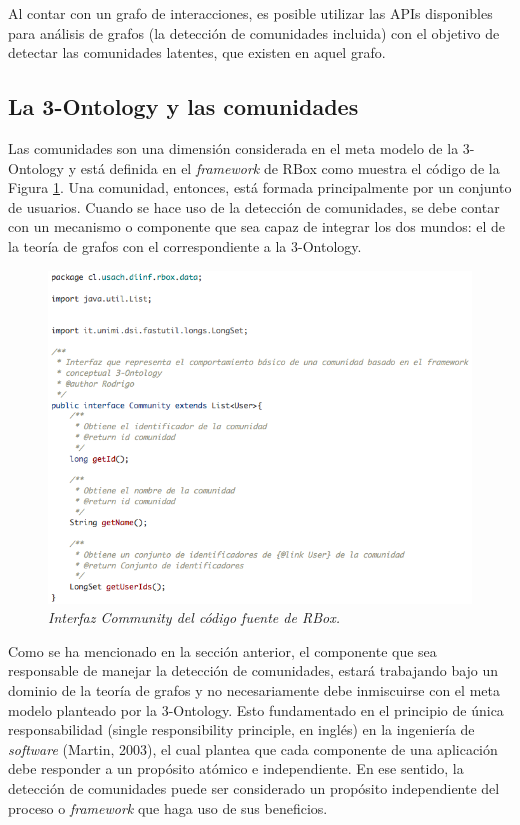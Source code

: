 Al contar con un grafo de interacciones, es posible utilizar las APIs disponibles para análisis de grafos (la detección de comunidades incluida) con el objetivo de detectar las comunidades latentes, que existen en aquel grafo.

\subsection{La 3-Ontology y las comunidades}

Las comunidades son una dimensión considerada en el meta modelo de la 3-Ontology y está definida en el \textit{framework} de RBox como muestra el código de la Figura \ref{fig:vis-im2}. Una comunidad, entonces, está formada principalmente por un conjunto de usuarios. Cuando se hace uso de la detección de comunidades, se debe contar con un mecanismo o componente que sea capaz de integrar los dos mundos: el de la teoría de grafos con el correspondiente a la 3-Ontology.

\begin{figure}
  \centering
  \includegraphics[scale=.5]{images/Figura7-2}
  \caption{\em Interfaz Community del código fuente de RBox.}
  \label{fig:vis-im2}
\end{figure}

Como se ha mencionado en la sección anterior, el componente que sea responsable de manejar la detección de comunidades, estará trabajando bajo un dominio de la teoría de grafos y no necesariamente debe inmiscuirse con el meta modelo planteado por la 3-Ontology. Esto fundamentado en el principio de única responsabilidad (single responsibility principle, en inglés) en la ingeniería de \textit{software} (Martin, 2003), el cual plantea que cada componente de una aplicación debe responder a un propósito atómico e independiente. En ese sentido, la detección de comunidades puede ser considerado un propósito independiente del proceso o \textit{framework} que haga uso de sus beneficios. 
    
